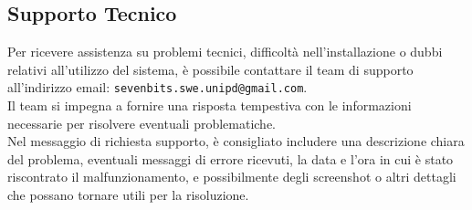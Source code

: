 \documentclass[10pt]{article}
\begin{document}
\begin{justify}
\newpage

\section{Supporto Tecnico}
\label{sec:supporto}
Per ricevere assistenza su problemi tecnici, difficoltà nell'installazione o dubbi relativi all'utilizzo del sistema, è possibile contattare il team di supporto all'indirizzo email: \texttt{sevenbits.swe.unipd@gmail.com}.\\
Il team si impegna a fornire una risposta tempestiva con le informazioni necessarie per risolvere eventuali problematiche.\\
Nel messaggio di richiesta supporto, è consigliato includere una descrizione chiara del problema, eventuali messaggi di errore ricevuti, la data e l'ora in cui è stato riscontrato il malfunzionamento, e possibilmente degli screenshot o altri dettagli che possano tornare utili per la risoluzione.








\end{justify}
\end{document}
